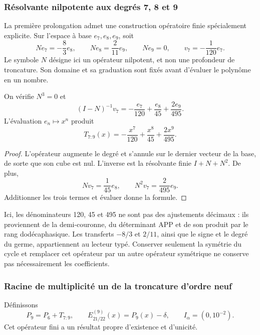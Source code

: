\subsubsection{Résolvante nilpotente aux degrés 7, 8 et 9}
\label{subsec:alpha-resolvente}

La première prolongation admet une construction opératoire finie
spécialement explicite. Sur l'espace à base \(e_7,e_8,e_9\),
soit
\[
 Ne_7=-\frac83e_8,\qquad Ne_8=\frac2{11}e_9,\qquad Ne_9=0,
 \qquad v_7=-\frac1{120}e_7.
\]
Le symbole \(N\) désigne ici un opérateur nilpotent, et non une profondeur de troncature. Son domaine et sa graduation sont fixés avant d'évaluer le polynôme en un nombre.

\begin{lemma}
\label{lem:alpha-resolvente}
On vérifie \(N^3=0\) et
\[
 (I-N)^{-1}v_7
 =-\frac{e_7}{120}+\frac{e_8}{45}+\frac{2e_9}{495}.
\]
L'évaluation \(e_n\mapsto x^n\) produit
\begin{equation}
 T_{7:9}(x)=-\frac{x^7}{120}+\frac{x^8}{45}+\frac{2x^9}{495}.
 \label{eq:alpha-t79}
\end{equation}
\end{lemma}

\begin{proof}
L'opérateur augmente le degré et s'annule sur le dernier vecteur de la base,
de sorte que son cube est nul. L'inverse est la résolvante finie
\(I+N+N^2\). De plus,
\[
 Nv_7=\frac1{45}e_8,\qquad N^2v_7=\frac2{495}e_9.
\]
Additionner les trois termes et évaluer donne la formule.
\end{proof}

Ici, les dénominateurs 120, 45 et 495 ne sont pas des ajustements décimaux : ils proviennent de la demi-couronne, du déterminant APP et de son produit par le rang dodécaphasique. Les transferts \(-8/3\) et \(2/11\), ainsi que le signe et le degré du germe, appartiennent au lecteur typé. Conserver seulement la symétrie du cycle et remplacer cet opérateur par un autre opérateur symétrique ne conserve pas nécessairement les coefficients.

\subsubsection{Racine de multiplicité un de la troncature d'ordre neuf}
\label{subsec:alpha-jet}

Définissons
\[
 P_9=P_6+T_{7:9},\qquad E_{21/22}^{(9)}(x)=P_9(x)-\delta,
 \qquad I_\alpha=(0,10^{-2}).
\]
Cet opérateur fini a un résultat propre d'existence et d'unicité.

